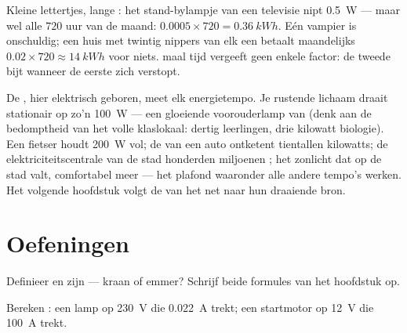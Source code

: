 \begin{example}[De sluipvampiers]\label{ex:g9:electric-power-energy:standby}
Kleine lettertjes, lange : het stand-bylampje van
een televisie nipt \qty{0.5}{W} --- maar wel alle $720$
uur van de maand: $0.0005 \times 720 = \qty{0.36}{kWh}$. Eén
vampier is onschuldig; een huis met twintig nippers van elk een
 betaalt maandelijks $0.02 \times 720 \approx
\qty{14}{kWh}$ voor niets.  maal tijd vergeeft geen enkele
factor: de tweede bijt wanneer de eerste zich verstopt.
\end{example}

\begin{remark}\label{rem:g9:electric-power-energy:wider}
De , hier elektrisch geboren, meet elk
energietempo. Je rustende lichaam draait stationair op zo'n
\qty{100}{W} --- een gloeiende voorouderlamp van  (denk aan
de bedomptheid van het volle klaslokaal: dertig leerlingen, drie
kilowatt biologie). Een fietser houdt \qty{200}{W} vol; de  van
een auto ontketent tientallen kilowatts; de elektriciteitscentrale van
de stad honderden miljoenen ; het zonlicht dat op de stad
valt, comfortabel meer --- het plafond waaronder alle andere tempo's
werken. Het volgende hoofdstuk volgt de  van het net naar
hun draaiende bron.
\end{remark}

\section{Oefeningen}

\begin{exercise}[$\star$]\label{exo:g9:electric-power-energy:1}
Definieer  en zijn  --- kraan of
emmer? Schrijf beide formules van het hoofdstuk op.
\end{exercise}

\begin{exercise}[$\star$]\label{exo:g9:electric-power-energy:2}
Bereken : een lamp op \qty{230}{V} die
\qty{0.022}{A} trekt; een startmotor op \qty{12}{V} die
\qty{100}{A} trekt.
\end{exercise}

